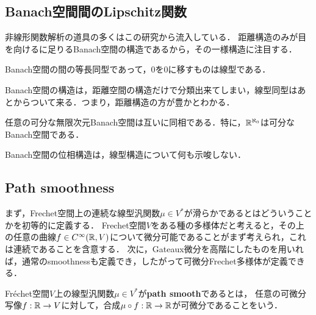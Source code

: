 \documentclass[uplatex,dvipdfmx]{jsreport}
\begin{document}
\subsection{Banach空間間のLipschitz関数}

\begin{tcolorbox}[colframe=ForestGreen, colback=ForestGreen!10!white,breakable,colbacktitle=ForestGreen!40!white,coltitle=black,fonttitle=\bfseries\sffamily,
title=]
    非線形関数解析の道具の多くはこの研究から流入している．
    距離構造のみが目を向けるに足りるBanach空間の構造であるから，その一様構造に注目する．\cite{Lindenstrauss}
\end{tcolorbox}

\begin{theorem}
    Banach空間の間の等長同型であって，$0$を$0$に移すものは線型である．
\end{theorem}
\begin{remarks}
    Banach空間の構造は，距離空間の構造だけで分類出来てしまい，線型同型はあとからついて来る．つまり，距離構造の方が豊かとわかる．
\end{remarks}

\begin{theorem}[Kadec]
    任意の可分な無限次元Banach空間は互いに同相である．特に，$\mathbb{R}^{\aleph_0}$は可分なBanach空間である．
\end{theorem}
\begin{remarks}
    Banach空間の位相構造は，線型構造について何も示唆しない．
\end{remarks}

\subsection{Path smoothness}

\begin{tcolorbox}[colframe=ForestGreen, colback=ForestGreen!10!white,breakable,colbacktitle=ForestGreen!40!white,coltitle=black,fonttitle=\bfseries\sffamily,
title=]
    まず，Frechet空間上の連続な線型汎関数$\mu\in V^*$が滑らかであるとはどういうことかを初等的に定義する．
    Frechet空間$V$をある種の多様体だと考えると，その上の任意の曲線$f\in C^\infty(\mathbb{R},V)$について微分可能であることがまず考えられ，これは連続であることを含意する．
    次に，Gateaux微分を高階にしたものを用いれば，通常のsmoothnessも定義でき，したがって可微分Frechet多様体が定義できる．
\end{tcolorbox}

\begin{definition}
    Fréchet空間$V$上の線型汎関数$\mu\in V^*$が\textbf{path smooth}であるとは，
    任意の可微分写像$f:\mathbb{R}\to V$に対して，合成$\mu\circ f:\mathbb{R}\to\mathbb{R}$が可微分であることをいう．
\end{definition}
\end{document}
